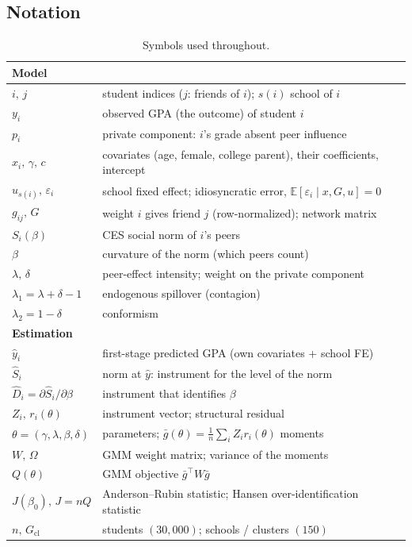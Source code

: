 \documentclass[11pt]{article}
\newcommand{\E}{\mathbb{E}}
\newcommand{\T}{^{\!\top}}
\begin{document}
\subsection{Notation}
\begin{table}[h]\centering\small
\caption{Symbols used throughout.}
\begin{tabular}{ll}
\toprule
\multicolumn{2}{l}{\textbf{Model}}\\
\midrule
$i,\,j$ & student indices ($j$: friends of $i$); $s(i)$ school of $i$ \\
$y_i$ & observed GPA (the outcome) of student $i$ \\
$p_i$ & private component: $i$'s grade absent peer influence \\
$x_i,\,\gamma,\,c$ & covariates (age, female, college parent), their coefficients, intercept \\
$u_{s(i)},\,\varepsilon_i$ & school fixed effect; idiosyncratic error, $\E[\varepsilon_i\mid x,G,u]=0$ \\
$g_{ij},\,G$ & weight $i$ gives friend $j$ (row-normalized); network matrix \\
$S_i(\beta)$ & CES social norm of $i$'s peers \\
$\beta$ & curvature of the norm (which peers count) \\
$\lambda,\,\delta$ & peer-effect intensity; weight on the private component \\
$\lambda_1=\lambda+\delta-1$ & endogenous spillover (contagion) \\
$\lambda_2=1-\delta$ & conformism \\
\midrule
\multicolumn{2}{l}{\textbf{Estimation}}\\
\midrule
$\widehat y_i$ & first-stage predicted GPA (own covariates + school FE) \\
$\widehat S_i$ & norm at $\widehat y$: instrument for the level of the norm \\
$\widehat D_i=\partial\widehat S_i/\partial\beta$ & instrument that identifies $\beta$ \\
$Z_i,\,r_i(\theta)$ & instrument vector; structural residual \\
$\theta=(\gamma,\lambda,\beta,\delta)$ & parameters; $\bar g(\theta)=\tfrac1n\sum_i Z_i r_i(\theta)$ moments \\
$W,\,\Omega$ & GMM weight matrix; variance of the moments \\
$Q(\theta)$ & GMM objective $\bar g\T W \bar g$ \\
$J(\beta_0),\,J=nQ$ & Anderson--Rubin statistic; Hansen over-identification statistic \\
$n,\,G_{\text{cl}}$ & students $(30{,}000)$; schools / clusters $(150)$ \\
\bottomrule
\end{tabular}
\end{table}
\end{document}
